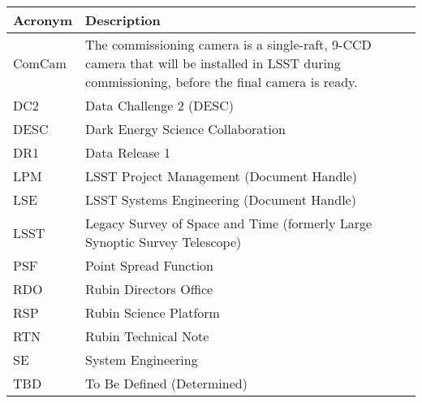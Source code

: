 \addtocounter{table}{-1}
\begin{longtable}{p{}p{}}\hline
\textbf{Acronym} & \textbf{Description}  \\\hline

ComCam & The commissioning camera is a single-raft, 9-CCD camera that will be installed in LSST during commissioning, before the final camera is ready. \\\hline
DC2 & Data Challenge 2 (DESC) \\\hline
DESC & Dark Energy Science Collaboration \\\hline
DR1 & Data Release 1 \\\hline
LPM & LSST Project Management (Document Handle) \\\hline
LSE & LSST Systems Engineering (Document Handle) \\\hline
LSST & Legacy Survey of Space and Time (formerly Large Synoptic Survey Telescope) \\\hline
PSF & Point Spread Function \\\hline
RDO & Rubin Directors Office \\\hline
RSP & Rubin Science Platform \\\hline
RTN & Rubin Technical Note \\\hline
SE & System Engineering \\\hline
TBD & To Be Defined (Determined) \\\hline
\end{longtable}
